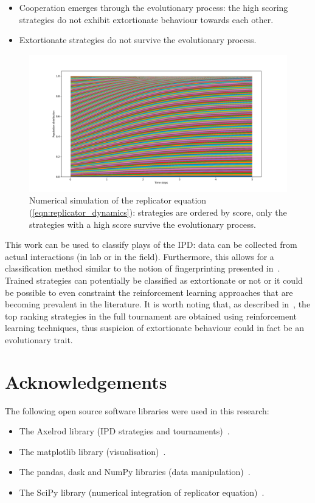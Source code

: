 \documentclass[a4paper]{article}
\begin{document}
\begin{itemize}
    \item Cooperation emerges through the evolutionary process: the high scoring
        strategies do not exhibit extortionate behaviour towards each other.
    \item Extortionate strategies do not survive the evolutionary process.
\end{itemize}

\begin{figure}[!htbp]
    \centering
    \includegraphics[width=.8\textwidth]{./assets/img/replicator_dynamics/main.pdf}
    \caption{Numerical simulation of the replicator equation
    (\ref{eqn:replicator_dynamics}): strategies are ordered by score, only the strategies with a high score survive the evolutionary process.}
    \label{fig:replicator_dynamics}
\end{figure}

This work can be used to classify plays of the IPD\@: data can be collected from
actual interactions (in lab or in the field). Furthermore, this allows for a
classification method similar to the notion of fingerprinting presented
in~\cite{Ashlock2008}. Trained strategies can potentially be classified as
extortionate or not or it could be possible to even constraint the reinforcement
learning approaches that are becoming prevalent in the literature. It is worth
noting that, as described in~\cite{Harper2017}, the top ranking strategies in
the full tournament are obtained using reinforcement learning techniques, thus
suspicion of extortionate behaviour could in fact be an evolutionary trait.

\section*{Acknowledgements}

The following open source software libraries were used in this research:

\begin{itemize}
    \item The Axelrod library (IPD strategies and
        tournaments)~\cite{Knight2016, Knight2018}.
    \item The matplotlib library (visualisation)~\cite{Droettboom2018}.
    \item The pandas, dask and NumPy libraries (data
        manipulation)~\cite{Structures2010, Dask2016, Oliphant2015}.
    \item The SciPy library (numerical integration of replicator
        equation)~\cite{Jones2001}.
\end{itemize}

\printbibliography
\end{document}
